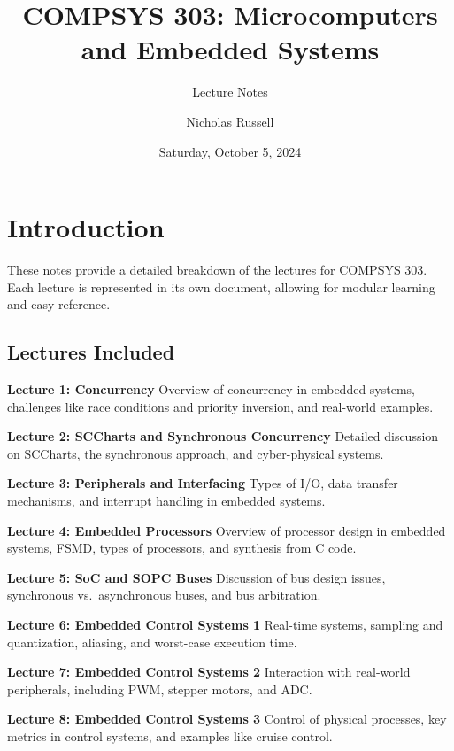 \documentclass[
  14pt,
  a4paper,
  numbers=noendperiod,
  headinclude=true,
  footinclude=true,
  DIV=calc]{scrreprt}
\title{COMPSYS 303: Microcomputers and Embedded Systems}
\subtitle{Lecture Notes}
\author{Nicholas Russell}
\date{Saturday, October 5, 2024}
\renewcommand*\contentsname{Table of contents}
\newcommand\contentsname{Table of contents}
\begin{document}
\maketitle

\renewcommand*\contentsname{Table of contents}
{
\hypersetup{linkcolor=}
\setcounter{tocdepth}{2}
\tableofcontents
}


\chapter*{Introduction}\label{introduction}


These notes provide a detailed breakdown of the lectures for COMPSYS
303. Each lecture is represented in its own document, allowing for
modular learning and easy reference.

\section*{Lectures Included}\label{lectures-included}


\textbf{Lecture 1: Concurrency} Overview of concurrency in embedded
systems, challenges like race conditions and priority inversion, and
real-world examples.

\textbf{Lecture 2: SCCharts and Synchronous Concurrency} Detailed
discussion on SCCharts, the synchronous approach, and cyber-physical
systems.

\textbf{Lecture 3: Peripherals and Interfacing} Types of I/O, data
transfer mechanisms, and interrupt handling in embedded systems.

\textbf{Lecture 4: Embedded Processors} Overview of processor design in
embedded systems, FSMD, types of processors, and synthesis from C code.

\textbf{Lecture 5: SoC and SOPC Buses} Discussion of bus design issues,
synchronous vs.~asynchronous buses, and bus arbitration.

\textbf{Lecture 6: Embedded Control Systems 1} Real-time systems,
sampling and quantization, aliasing, and worst-case execution time.

\textbf{Lecture 7: Embedded Control Systems 2} Interaction with
real-world peripherals, including PWM, stepper motors, and ADC.

\textbf{Lecture 8: Embedded Control Systems 3} Control of physical
processes, key metrics in control systems, and examples like cruise
control.
\end{document}
